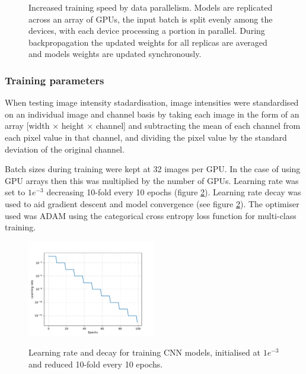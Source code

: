 \documentclass[a4paper,11pt,twoside,openright]{scrbook}
\begin{document}
\begin{figure}
    \captionsetup{width=0.8\textwidth}
    \caption[Multi-GPU distributed training]{Increased training speed by data parallelism. Models are replicated across an array of GPUs, the input batch is split evenly among the devices, with each device processing a portion in parallel.
During backpropagation the updated weights for all replicas are averaged and models weights are updated synchronously.}
    
    \label{figure:multi_GPU}
\end{figure}


\subsubsection{Training parameters}

When testing image intensity stadardisation, image intensities were standardised on an individual image and channel basis by taking each image in the form of an array [width $\times$ height $\times$ channel] and subtracting the mean of each channel from each pixel value in that channel, and dividing the pixel value by the standard deviation of the original channel.

Batch sizes during training were kept at 32 images per GPU.
In the case of using GPU arrays then this was multiplied by the number of GPUs.
Learning rate was set to $1e^{-3}$ decreasing 10-fold every 10 epochs (figure \ref{figure:learningRate}).
Learning rate decay was used to aid gradient descent and model convergence (see figure \ref{figure:learningRate}).
The optimiser used was ADAM \cite{Kingma2014} using the categorical cross entropy loss function for multi-class training.

\begin{figure}
    \captionsetup{width=0.8\textwidth}
    \caption[CNN learning rate and decay]{
Learning rate and decay for training CNN models, initialised at $1e^{-3}$ and reduced 10-fold every 10 epochs.
}
    \includegraphics[width=0.5\textwidth]{ch2learningRate}
    \label{figure:learningRate}
\end{figure}
\end{document}
